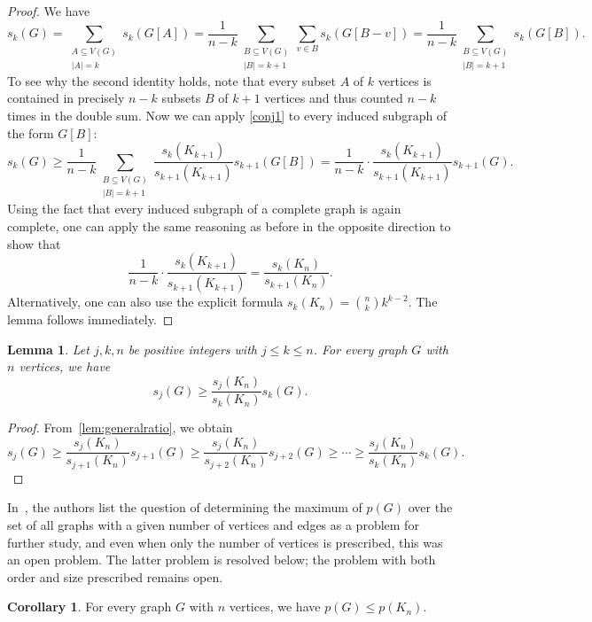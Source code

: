 \documentclass[11pt]{article}
\newtheorem{lem}[thr]{Lemma}
\theoremstyle{definition}
\newtheorem{cor}[thr]{Corollary}
\newcommand*{\abs}[1]{\lvert #1\rvert}
\begin{document}
\begin{proof}
We have
$$s_k(G) = \sum_{\substack{A \subseteq V(G) \\ \abs{A} = k}} s_k(G[A]) = \frac{1}{n-k} \sum_{\substack{B \subseteq V(G) \\ \abs{B} = k+1}} \sum_{v \in B} s_k(G[B-v]) = \frac{1}{n-k} \sum_{\substack{B \subseteq V(G) \\ \abs{B} = k+1}} s_k(G[B]).$$
To see why the second identity holds, note that every subset $A$ of $k$ vertices is contained in precisely $n-k$ subsets $B$ of $k+1$ vertices and thus counted $n-k$ times in the double sum. Now we can apply \cref{conj1} to every induced subgraph of the form $G[B]$:
$$s_k(G) \ge \frac{1}{n-k} \sum_{\substack{B \subseteq V(G) \\ \abs{B} = k+1}} \frac{s_{k}(K_{k+1})}{s_{k+1}(K_{k+1})} s_{k+1}(G[B]) = \frac{1}{n-k} \cdot \frac{s_{k}(K_{k+1})}{s_{k+1}(K_{k+1})} s_{k+1}(G).$$
Using the fact that every induced subgraph of a complete graph is again complete, one can apply the same reasoning as before in the opposite direction to show that
$$\frac{1}{n-k} \cdot \frac{s_{k}(K_{k+1})}{s_{k+1}(K_{k+1})} = \frac{s_k(K_n)}{s_{k+1}(K_n)}.$$
Alternatively, one can also use the explicit formula $s_k(K_n) = \binom{n}{k} k^{k-2}$. The lemma follows immediately.
\end{proof}

\begin{lem}\label{lemma:quotients}
Let $j,k,n$ be positive integers with $j \le k \le n$. For every graph $G$ with $n$ vertices, we have
$$s_j(G) \ge \frac{s_j(K_n)}{s_k(K_n)} s_k(G).$$
\end{lem}

\begin{proof}
From~\cref{lem:generalratio}, we obtain
$$
s_j(G)\ge \frac{s_j(K_n)}{s_{j+1}(K_n)} s_{j+1}(G) \ge \frac{s_{j}(K_n)}{s_{j+2}(K_n)} s_{j+2}(G) \ge \cdots \ge \frac{s_{j}(K_n)}{s_{k}(K_n)} s_{k}(G).
$$
\end{proof}

In~\cite{CGMV18}, the authors list the question of determining the maximum of $p(G)$ over the set of all graphs with a given number of vertices and edges as a problem for further study, and even when only the number of vertices is prescribed, this was an open problem. The latter problem is resolved below; the problem with both order and size prescribed remains open.

\begin{cor}\label{conj2}
For every graph $G$ with $n$ vertices, we have $p(G) \le p(K_n)$.
\end{cor}
\end{document}
